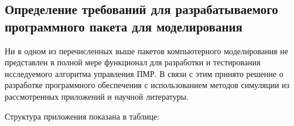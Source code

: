 \newpage
\subsection{\textbf{Определение требований для разрабатываемого программного пакета для моделирования}}

Ни в одном из перечисленных выше пакетов компьютерного моделирования не представлен в полной мере функционал для разработки и тестирования исследуемого алгоритма управления ПМР. В связи с этим принято решение о разработке программного обеспечения с использованием методов симуляции из рассмотренных приложений и научной литературы.



Структура приложения показана в таблице:
\begin{gosttable} %
    \begin{table}[h!] %
        \centering %
        \caption{Структура разрабатываемого программного комплекса} %
\end{table}
\end{gosttable}
